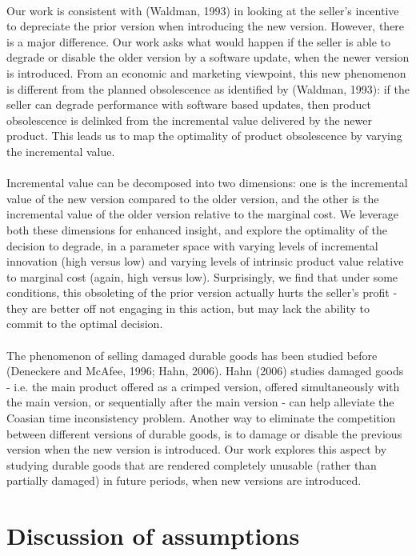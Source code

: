 \documentclass{article}
\begin{document}
\\
Our work is consistent with (Waldman, 1993) in looking at the seller{'}s incentive to depreciate the prior version when introducing the new version.
However, there is a major difference. Our work asks what would happen if the seller is able to degrade or disable the older version by a software
update, when the newer version is introduced. From an economic and marketing viewpoint, this new phenomenon is different from the planned obsolescence
as identified by (Waldman, 1993): if the seller can degrade performance with software based updates, then product obsolescence is delinked from the
incremental value delivered by the newer product. This leads us to map the optimality of product obsolescence by varying the incremental value. \\
\\
Incremental value can be decomposed into two dimensions: one is the incremental value of the new version compared to the older version, and the other
is the incremental value of the older version relative to the marginal cost. We leverage both these dimensions for enhanced insight, and explore
the optimality of the decision to degrade, in a parameter space with varying levels of incremental innovation (high versus low) and varying levels
of { }intrinsic product value relative to marginal cost (again, high versus low). Surprisingly, we find that under some conditions, this obsoleting
of the prior version actually hurts the seller{'}s profit - they are better off not engaging in this action, but may lack the ability to commit to
the optimal decision.\\
\\
The phenomenon of selling damaged durable goods has been studied before (Deneckere and McAfee, 1996; Hahn, 2006). Hahn (2006) studies damaged goods
- i.e. the main product offered as a crimped version, offered simultaneously with the main version, or sequentially after the main version - can
help alleviate the Coasian time inconsistency problem. Another way to eliminate the competition between different versions of durable goods, is to
damage or disable the previous version when the new version is introduced. Our work explores this aspect by studying durable goods that are rendered
completely unusable (rather than partially damaged) in future periods, when new versions are introduced. 

\section*{Discussion of assumptions}
\end{document}
